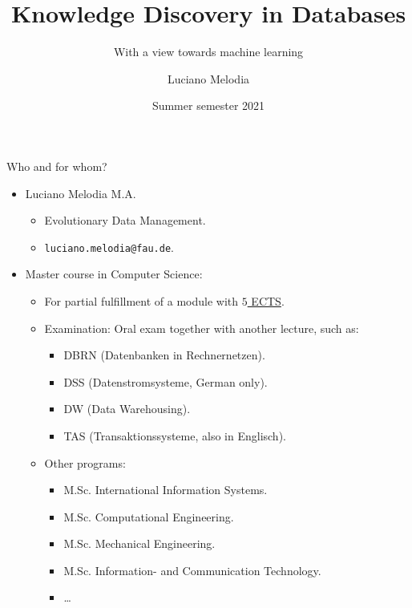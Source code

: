 \documentclass[aspectratio=169,t]{beamer}
\title[KDD]{Knowledge Discovery in Databases}
\subtitle{With a view towards machine learning}
\author[L.~Melodia]{Luciano Melodia}
\institute[Department]{Evolutionary Data Management, Friedrich-Alexander University Erlangen-Nürnberg}
\date{Summer semester 2021}
\begin{document}
  \maketitle

  { %
    \begin{frame}{Who and for whom?}
      \begin{itemize}
        \item Luciano Melodia M.A.
            \begin{itemize}
              \item Evolutionary Data Management.
              \item \texttt{luciano.melodia@fau.de}.
            \end{itemize}
        \item Master course in Computer Science:
            \begin{itemize}
              \item For partial fulfillment of a module with \underline{$5$ ECTS}.
              \item Examination: Oral exam together with another lecture, such as:
                  \begin{itemize}
                      \item DBRN (Datenbanken in Rechnernetzen).
                      \item DSS (Datenstromsysteme, German only).
                      \item DW (Data Warehousing).
                      \item TAS (Transaktionssysteme, also in Englisch).
                  \end{itemize}
              \item Other programs:
                  \begin{itemize}
                      \item M.Sc. International Information Systems.
                      \item M.Sc. Computational Engineering.
                      \item M.Sc. Mechanical Engineering.
                      \item M.Sc. Information- and Communication Technology.
                      \item \ldots
                  \end{itemize}
            \end{itemize}
      \end{itemize}
    \end{frame}
  }
\end{document}
